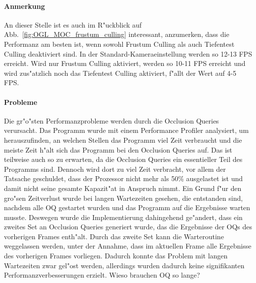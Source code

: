 \documentclass[journal]{vgtc}
\begin{document}
\paragraph{Anmerkung} An dieser Stelle ist es auch im R"uckblick auf Abb.\ \ref{fig:OGL_MOC_frustum_culling} interessant, anzumerken, dass die Performanz am besten ist, wenn sowohl Frustum Culling als auch Tiefentest Culling deaktiviert sind. In der Standard-Kameraeinstellung werden so 12-13 FPS erreicht. Wird nur Frustum Culling aktiviert, werden so 10-11 FPS erreicht und wird zus"atzlich noch das Tiefentest Culling aktiviert, f"allt der Wert auf 4-5 FPS.\\

\paragraph{Probleme} Die gr"o"sten Performanzprobleme werden durch die Occlusion Queries verursacht. Das Programm wurde mit einem Performance Profiler analysiert, um herauszufinden, an welchen Stellen das Programm viel Zeit verbraucht und die meiste Zeit h"alt sich das Programm bei den Occlusion Queries auf. Das ist teilweise auch so zu erwarten, da die Occlusion Queries ein essentieller Teil des Programms sind. Dennoch wird dort zu viel Zeit verbracht, vor allem der Tatsache geschuldet, dass der Prozessor nicht mehr als 50\% ausgelastet ist und damit nicht seine gesamte Kapazit"at in Anspruch nimmt. Ein Grund f"ur den gro"sen Zeitverlust wurde bei langen Wartezeiten gesehen, die entstanden sind, nachdem alle OQ gestartet wurden und das Programm auf die Ergebnisse warten musste. Deswegen wurde die Implementierung dahingehend ge"andert, dass ein zweites Set an Occlusion Queries generiert wurde, das die Ergebnisse der OQs des vorherigen Frames enth"alt. Durch das zweite Set kann die Warteroutine weggelassen werden, unter der Annahme, dass im aktuellen Frame alle Ergebnisse des vorherigen Frames vorliegen. Dadurch konnte das Problem mit langen Wartezeiten zwar gel"ost werden, allerdings wurden dadurch keine signifikanten Performanzverbesserungen erzielt.
Wieso brauchen OQ so lange?
\end{document}
